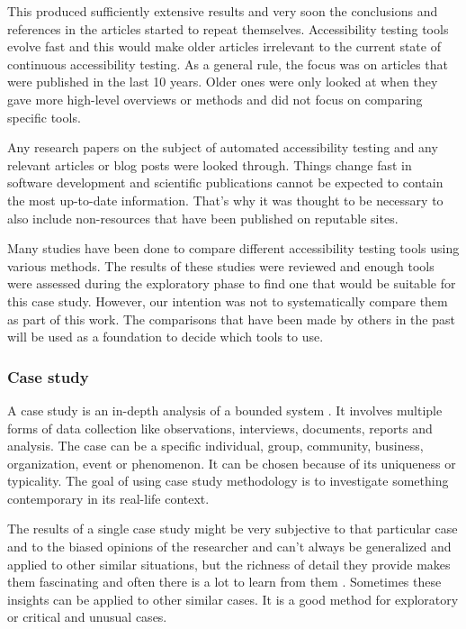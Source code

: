 \documentclass{master_thesis}
\begin{document}
This produced sufficiently extensive results and very soon the conclusions and references in the articles started to repeat themselves. Accessibility testing tools evolve fast and this would make older articles irrelevant to the current state of continuous accessibility testing. As a general rule, the focus was on articles that were published in the last 10 years. Older ones were only looked at when they gave more high-level overviews or methods and did not focus on comparing specific tools.

Any research papers on the subject of automated accessibility testing and any relevant articles or blog posts were looked through. Things change fast in software development and scientific publications cannot be expected to contain the most up-to-date information. That's why it was thought to be necessary to also include non-resources that have been published on reputable sites.

Many studies \citep{Alsaeedi2020, Ismailova2022, Sane2021, Vigo2013, RybinKoob2022, Duran2017} have been done to compare different accessibility testing tools using various methods. The results of these studies were reviewed and enough tools were assessed during the exploratory phase to find one that would be suitable for this case study. However, our intention was not to systematically compare them as part of this work. The comparisons that have been made by others in the past will be used as a foundation to decide which tools to use.

\subsubsection{Case study}

A case study is an in-depth analysis of a bounded system \citep{Range2023}. It involves multiple forms of data collection like observations, interviews, documents, reports and analysis. The case can be a specific individual, group, community, business, organization, event or phenomenon. It can be chosen because of its uniqueness or typicality. The goal of using case study methodology is to investigate something contemporary in its real-life context.

The results of a single case study might be very subjective to that particular case and to the biased opinions of the researcher and can't always be generalized and applied to other similar situations, but the richness of detail they provide makes them fascinating and often there is a lot to learn from them \citep{Range2023}. Sometimes these insights can be applied to other similar cases. It is a good method for exploratory or critical and unusual cases.
\end{document}
